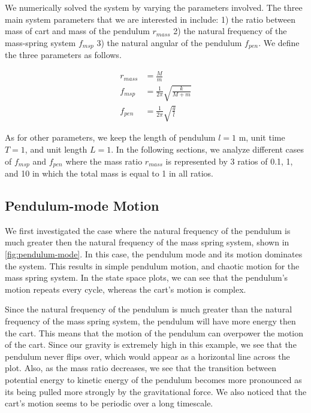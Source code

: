 \documentclass[12pt]{article}
\begin{document}
We numerically solved the system by varying the parameters involved. The three main system parameters that we are interested in include: 1) the ratio between mass of cart and mass of the pendulum $r_{mass}$ 2) the natural frequency of the mass-spring system $f_{msp}$ 3) the natural angular of the pendulum $f_{pen}$. We define the three parameters as follows.

\begin{align}
    r_{mass} &= \frac{M}{m} \\
    f_{msp} &= \frac{1}{2\pi}\sqrt{\frac{k}{M+m}} \\
    f_{pen} &= \frac{1}{2\pi}\sqrt{\frac{g}{l}}
\end{align}

As for other parameters, we keep the length of pendulum $l = 1$ m, unit time $T = 1$, and unit length $L = 1$. In the following sections, we analyze different cases of $f_{msp}$ and $f_{pen}$ where the mass ratio $r_{mass}$ is represented by 3 ratios of 0.1, 1, and 10 in which the total mass is equal to 1 in all ratios.

\subsection{Pendulum-mode Motion}

We first investigated the case where the natural frequency of the pendulum is much greater then the natural frequency of the mass spring system, shown in \autoref{fig:pendulum-mode}. In this case, the pendulum mode and its motion dominates the system. This results in simple pendulum motion, and chaotic motion for the mass spring system. In the state space plots, we can see that the pendulum's motion repeats every cycle, whereas the cart's motion is complex.

Since the natural frequency of the pendulum is much greater than the natural frequency of the mass spring system, the pendulum will have more energy then the cart. This means that the motion of the pendulum can overpower the motion of the cart. Since our gravity is extremely high in this example, we see that the pendulum never flips over, which would appear as a horizontal line across the plot. Also, as the mass ratio decreases, we see that the transition between potential energy to kinetic energy of the pendulum becomes more pronounced as its being pulled more strongly by the gravitational force. We also noticed that the cart's motion seems to be periodic over a long timescale.
\end{document}
